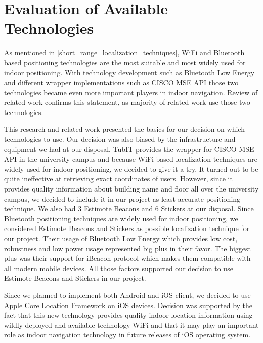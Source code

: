 \section{Evaluation of Available Technologies}
As mentioned in \ref{short_range_localization_techniques}, WiFi and Bluetooth based positioning technologies are the most suitable and most widely used for indoor positioning. With technology development such as Bluetooth Low Energy and different wrapper implementations such as CISCO MSE API those two technologies became even more important players in indoor navigation. Review of related work confirms this statement, as majority of related work use those two technologies.

This research and related work presented the basics for our decision on which technologies to use. Our decision was also biased by the infrastructure and equipment we had at our disposal. TubIT provides the wrapper for CISCO MSE API in the university campus and because WiFi based localization techniques are widely used for indoor positioning, we decided to give it a try. It turned out to be quite ineffective at retrieving exact coordinates of users. However, since it provides quality information about building name and floor all over the university campus, we decided to include it in our project as least accurate positioning technique. We also had 3 Estimote Beacons and 6 Stickers at our disposal. Since Bluetooth positioning techniques are widely used for indoor positioning, we considered Estimote Beacons and Stickers as possible localization technique for our project. Their usage of Bluetooth Low Energy which provides low cost, robustness and low power usage represented big plus in their favor. The biggest plus was their support for iBeacon protocol which makes them compatible with all modern mobile devices. All those factors supported our decision to use Estimote Beacons and Stickers in our project.

Since we planned to implement both Android and iOS client, we decided to use Apple Core Location Framework on iOS devices. Decision was supported by the fact that this new technology provides quality indoor location information using wildly deployed and available technology WiFi and that it may play an important role as indoor navigation technology in future releases of iOS operating system.
